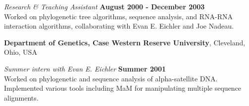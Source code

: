 \documentclass[margin,line]{res}
\begin{document}
\begin{resume}
{                                         \vspace{-.2cm}
                                                {\em Research \& Teaching Assistant} \hfill {\bf August 2000 - December 2003}\\
                                                Worked on phylogenetic tree algorithms, sequence analysis, and RNA-RNA
                                                interaction algorithms, collaborating with Evan E. Eichler and Joe
                                                Nadeau.                                                 
                                                
                                                {\bf Department of Genetics, Case Western Reserve University},
                                                Cleveland, Ohio, USA
                                                
                                                \vspace{-.2cm}
                                                       {\em Summer intern with Evan E. Eichler} \hfill {\bf Summer 2001}\\
                                                       Worked on phylogenetic and sequence analysis of alpha-satellite
                                                       DNA. Implemented various tools including MaM for manipulating multiple
                                                       sequence alignments.
                                       }
                                       

\end{resume}
\end{document}
